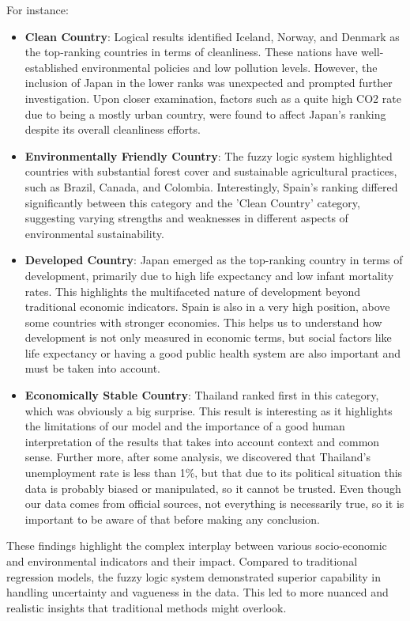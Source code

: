 \documentclass[fleqn,11pt]{article}
\begin{document}
For instance:
\begin{itemize}
    \item \textbf{Clean Country}: Logical results identified Iceland, Norway, and Denmark as the top-ranking countries in terms of cleanliness. These nations have well-established environmental policies and low pollution levels. However, the inclusion of Japan in the lower ranks was unexpected and prompted further investigation. Upon closer examination, factors such as a quite high CO2 rate due to being a mostly urban country, were found to affect Japan's ranking despite its overall cleanliness efforts.
    \item \textbf{Environmentally Friendly Country}: The fuzzy logic system highlighted countries with substantial forest cover and sustainable agricultural practices, such as Brazil, Canada, and Colombia. Interestingly, Spain's ranking differed significantly between this category and the 'Clean Country' category, suggesting varying strengths and weaknesses in different aspects of environmental sustainability.
    \item \textbf{Developed Country}: Japan emerged as the top-ranking country in terms of development, primarily due to high life expectancy and low infant mortality rates. This highlights the multifaceted nature of development beyond traditional economic indicators. Spain is also in a very high position, above some countries with stronger economies. This helps us to understand how development is not only measured in economic terms, but social factors like life expectancy or having a good public health system are also important and must be taken into account.
    \item \textbf{Economically Stable Country}: Thailand ranked first in this category, which was obviously a big surprise. This result is interesting as it highlights the limitations of our model and the importance of a good human interpretation of the results that takes into account context and common sense. Further more, after some analysis, we discovered that Thailand's unemployment rate is less than 1\%, but that due to its political situation this data is probably biased or manipulated, so it cannot be trusted. Even though our data comes from official sources, not everything is necessarily true, so it is important to be aware of that before making any conclusion.
\end{itemize}

These findings highlight the complex interplay between various socio-economic and environmental indicators and their impact. Compared to traditional regression models, the fuzzy logic system demonstrated superior capability in handling uncertainty and vagueness in the data. This led to more nuanced and realistic insights that traditional methods might overlook.
\end{document}
